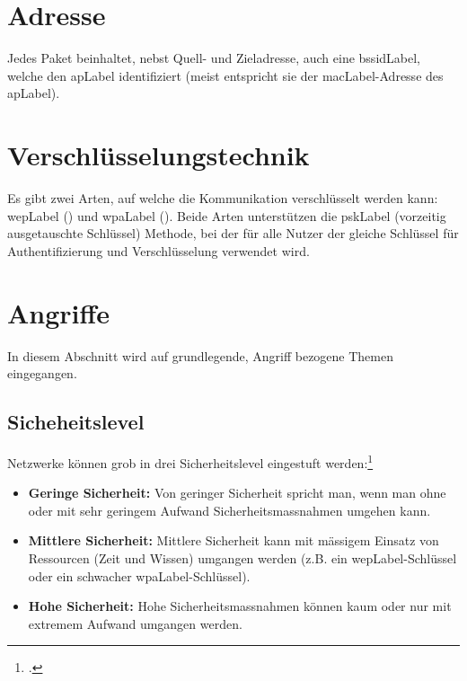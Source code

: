 \section{Adresse}
Jedes Paket beinhaltet, nebst Quell- und Zieladresse, auch eine \gls{bssidLabel}, welche den \gls{apLabel} identifiziert (meist entspricht sie der \gls{macLabel}-Adresse des \gls{apLabel}).


\section{Verschlüsselungstechnik}
Es gibt zwei Arten, auf welche die Kommunikation verschlüsselt werden kann: \gls{wepLabel} () und \gls{wpaLabel} ().
Beide Arten unterstützen die \gls{pskLabel} (vorzeitig ausgetauschte Schlüssel) Methode, bei der für alle Nutzer der gleiche Schlüssel für Authentifizierung und Verschlüsselung verwendet wird.


\section{Angriffe}
In diesem Abschnitt wird auf grundlegende, Angriff bezogene Themen eingegangen.

\subsection{Sicheheitslevel}
Netzwerke können grob in drei Sicherheitslevel eingestuft werden:\footcite[][115]{WrightCache201503}
\begin{itemize}
	\item \textbf{Geringe Sicherheit:} Von geringer Sicherheit spricht man, wenn man ohne oder mit sehr geringem Aufwand Sicherheitsmassnahmen umgehen kann.
	\item \textbf{Mittlere Sicherheit:} Mittlere Sicherheit kann mit mässigem Einsatz von Ressourcen (Zeit und Wissen) umgangen werden (z.B. ein \gls{wepLabel}-Schlüssel oder ein schwacher \gls{wpaLabel}-Schlüssel).
	\item \textbf{Hohe Sicherheit:} Hohe Sicherheitsmassnahmen können kaum oder nur mit extremem Aufwand umgangen werden.
\end{itemize}

